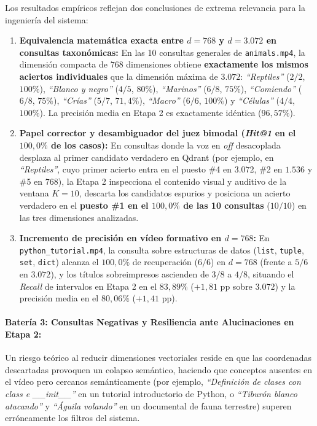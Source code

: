 Los resultados empíricos reflejan dos conclusiones de extrema relevancia para la ingeniería del sistema:
\begin{enumerate}
    \item \textbf{Equivalencia matemática exacta entre $d = 768$ y $d = 3.072$ en consultas taxonómicas:} En las 10 consultas generales de \texttt{animals.mp4}, la dimensión compacta de $768$ dimensiones obtiene \textbf{exactamente los mismos aciertos individuales} que la dimensión máxima de $3.072$: \textit{``Reptiles''} ($2/2$, $100\%$), \textit{``Blanco y negro''} ($4/5$, $80\%$), \textit{``Marinos''} ($6/8$, $75\%$), \textit{``Comiendo''} ($6/8$, $75\%$), \textit{``Crías''} ($5/7$, $71,4\%$), \textit{``Macro''} ($6/6$, $100\%$) y \textit{``Células''} ($4/4$, $100\%$). La precisión media en Etapa 2 es exactamente idéntica ($96,57\%$).
    \item \textbf{Papel corrector y desambiguador del juez bimodal (\textit{Hit@1} en el $100,0\%$ de los casos):} En consultas donde la voz en \textit{off} desacoplada desplaza al primer candidato verdadero en Qdrant (por ejemplo, en \textit{``Reptiles''}, cuyo primer acierto entra en el puesto \#4 en $3.072$, \#2 en $1.536$ y \#5 en $768$), la Etapa 2 inspecciona el contenido visual y auditivo de la ventana $K=10$, descarta los candidatos espurios y posiciona un acierto verdadero en el \textbf{puesto \#1 en el $100,0\%$ de las 10 consultas} ($10/10$) en las tres dimensiones analizadas.
    \item \textbf{Incremento de precisión en vídeo formativo en $d=768$:} En \texttt{python\_tutorial.mp4}, la consulta sobre estructuras de datos (\texttt{list}, \texttt{tuple}, \texttt{set}, \texttt{dict}) alcanza el $100,0\%$ de recuperación ($6/6$) en $d = 768$ (frente a $5/6$ en $3.072$), y los títulos sobreimpresos ascienden de $3/8$ a $4/8$, situando el \textit{Recall} de intervalos en Etapa 2 en el $83,89\%$ ($+1,81\text{ pp}$ sobre $3.072$) y la precisión media en el $80,06\%$ ($+1,41\text{ pp}$).
\end{enumerate}

\paragraph{Batería 3: Consultas Negativas y Resiliencia ante Alucinaciones en Etapa 2:}
Un riesgo teórico al reducir dimensiones vectoriales reside en que las coordenadas descartadas provoquen un colapso semántico, haciendo que conceptos ausentes en el vídeo pero cercanos semánticamente (por ejemplo, \textit{``Definición de clases con class e \_\_init\_\_''} en un tutorial introductorio de Python, o \textit{``Tiburón blanco atacando''} y \textit{``Águila volando''} en un documental de fauna terrestre) superen erróneamente los filtros del sistema.

